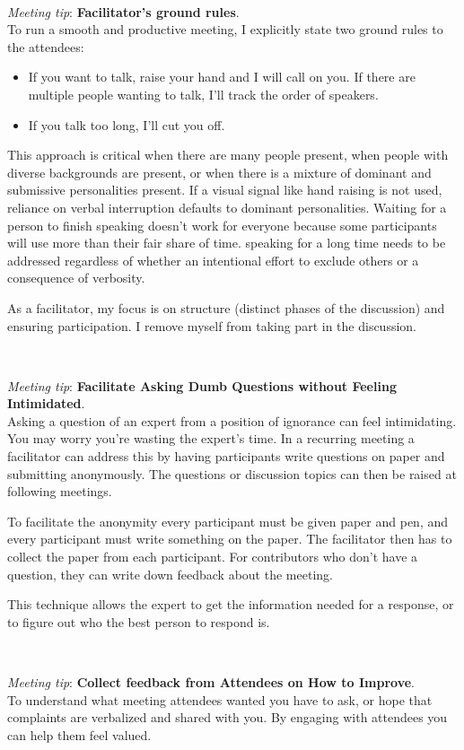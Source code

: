 \ \\
\begin{samepage}
\textit{Meeting tip}: \textbf{Facilitator's ground rules}.\\
To run a smooth and productive meeting, I explicitly state two ground rules to the attendees:
\end{samepage}
\begin{itemize}
    \item If you want to talk, raise your hand and I will call on you. If there are multiple people wanting to talk, I'll track the order of speakers.
    \item If you talk too long, I'll cut you off. 
\end{itemize}
This approach is critical when there are many people present, when people with diverse backgrounds are present, or when there is a mixture of dominant and submissive personalities present. 
If a visual signal like hand raising is not used, reliance on verbal interruption defaults to dominant personalities. Waiting for a person to finish speaking doesn't work for everyone because some participants will use more than their fair share of time. speaking for a long time needs to be addressed regardless of whether an intentional effort to exclude others or a consequence of verbosity.

As a facilitator, my focus is on structure (distinct phases of the discussion) and ensuring participation. I remove myself from taking part in the discussion.

\ \\
\begin{samepage}
\textit{Meeting tip}: \textbf{Facilitate Asking Dumb Questions without Feeling Intimidated}.\\
\nopagebreak %
Asking a question of an expert from a position of ignorance can feel intimidating. You may worry you're wasting the expert's time. In a recurring meeting a facilitator can address this by having participants write questions on paper and submitting anonymously. The questions or discussion topics can then be raised at following meetings. 
\end{samepage}

To facilitate the anonymity every participant must be given paper and pen, and every participant must write something on the paper. The facilitator then has to collect the paper from each participant. For contributors who don't have a question, they can write down feedback about the meeting. 

This technique allows the expert to get the information needed for a response, or to figure out who the best person to respond is. 

\ \\
\begin{samepage}
\textit{Meeting tip}: \textbf{Collect feedback from Attendees on How to Improve}.\\
To understand what meeting attendees wanted you have to ask, or hope that complaints are verbalized and shared with you. By engaging with attendees you can help them feel valued.
\end{samepage}